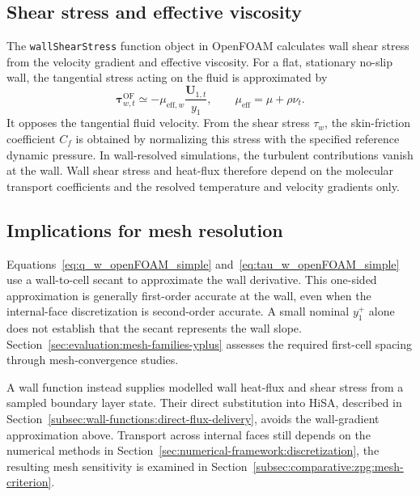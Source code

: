 \subsection{Shear stress and effective viscosity}

The \texttt{wallShearStress} function object in OpenFOAM calculates wall shear stress from the velocity gradient and effective viscosity. For a flat, stationary no-slip wall, the tangential stress acting on the fluid is approximated by
\begin{equation}
    \boldsymbol{\tau}_{w,t}^{\mathrm{OF}}
    \simeq -\mu_{\mathrm{eff},w}\frac{\boldsymbol{U}_{1,t}}{y_1},
    \qquad
    \mu_{\mathrm{eff}}=\mu+\rho\nu_t.
    \label{eq:tau_w_openFOAM_simple}
\end{equation}
It opposes the tangential fluid velocity. From the shear stress \(\tau_w\), the skin-friction coefficient \(C_f\) is obtained by normalizing this stress with the specified reference dynamic pressure. In wall-resolved simulations, the turbulent contributions vanish at the wall. Wall shear stress and heat-flux therefore depend on the molecular transport coefficients and the resolved temperature and velocity gradients only.

\subsection{Implications for mesh resolution}

Equations~\eqref{eq:q_w_openFOAM_simple} and~\eqref{eq:tau_w_openFOAM_simple} use a wall-to-cell secant to approximate the wall derivative. This one-sided approximation is generally first-order accurate at the wall, even when the internal-face discretization is second-order accurate. A small nominal \(y_1^+\) alone does not establish that the secant represents the wall slope. Section~\ref{sec:evaluation:mesh-families-yplus} assesses the required first-cell spacing through mesh-convergence studies.
\par\medskip

A wall function instead supplies modelled wall heat-flux and shear stress from a sampled boundary layer state. Their direct substitution into HiSA, described in Section~\ref{subsec:wall-functions:direct-flux-delivery}, avoids the wall-gradient approximation above. Transport across internal faces still depends on the numerical methods in Section~\ref{sec:numerical-framework:discretization}, the resulting mesh sensitivity is examined in Section~\ref{subsec:comparative:zpg:mesh-criterion}.
